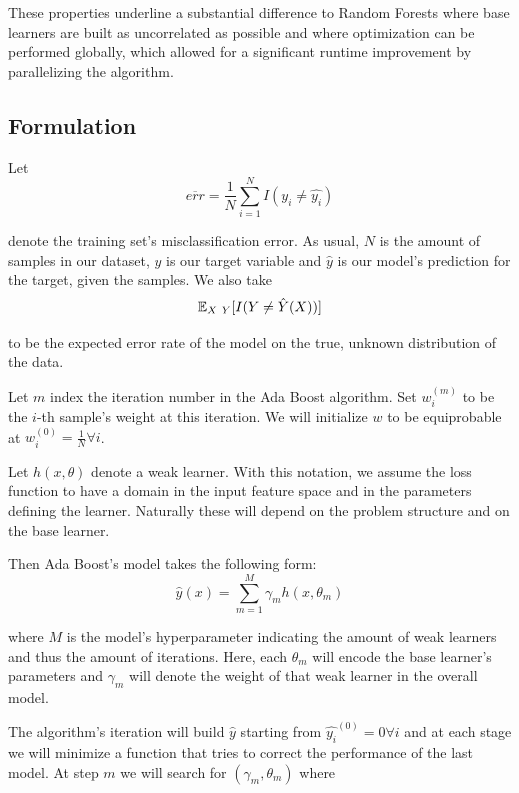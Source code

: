 These properties underline a substantial difference to Random Forests where base learners are built as uncorrelated as possible and where optimization can be performed globally, which allowed for a significant runtime improvement by parallelizing the algorithm.

\subsection{Formulation}\label{subsection:adaboost_formulation}

Let
\begin{equation}\label{eq:adaBoostTrainingError}
\overline{err} = \frac{1}{N} \sum_{i=1}^{N} I(y_i \neq \hat{y_i})
\end{equation}

denote the training set's misclassification error.
As usual, $N$ is the amount of samples in our dataset, $y$ is our target variable and $\hat{y}$ is our model's prediction for the target, given the samples.
We also take
\begin{equation}
\operatorname{\mathbb{E}}_{X \ Y} [ I(Y \neq \hat{Y}(X)) ]
\end{equation}

to be the expected error rate of the model on the true, unknown distribution of the data.

Let $m$ index the iteration number in the Ada Boost algorithm.
Set $w^{(m)}_i$ to be the $i$-th sample's weight at this iteration.
We will initialize $w$ to be equiprobable at $w^{(0)}_i = \frac{1}{N} \forall i$.

Let $h(x,\theta)$ denote a weak learner.
With this notation, we assume the loss function to have a domain in the input feature space and in the parameters defining the learner.
Naturally these will depend on the problem structure and on the base learner.

Then Ada Boost's model takes the following form:
\begin{equation}\label{eq:adaBoostModel}
\hat{y}(x) = \sum_{m=1}^{M} \gamma_m h(x,\theta_m)
\end{equation}

where $M$ is the model's hyperparameter indicating the amount of weak learners and thus the amount of iterations.
Here, each $\theta_m$ will encode the base learner's parameters and $\gamma_m$ will denote the weight of that weak learner in the overall model.

The algorithm's iteration will build $\hat{y}$ starting from $\hat{y_i}^{(0)}= 0 \forall i$ and at each stage we will minimize a function that tries to correct the performance of the last model.
At step $m$ we will search for $(\gamma_{m}, \theta_{m})$ where

